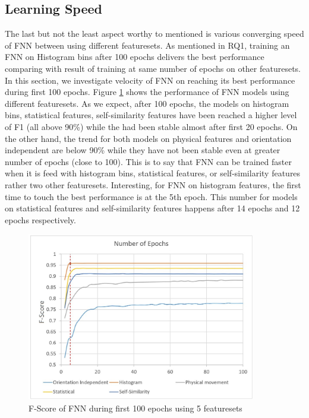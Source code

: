 \documentclass[journal,article,submit,moreauthors,pdftex]{Definitions/mdpi}
\begin{document}
\subsection{Learning Speed }
The last but not the least aspect worthy to mentioned is various converging speed of FNN between using different featuresets. As mentioned in RQ1, training an FNN on Histogram bins after 100 epochs delivers the best performance comparing with result of training at same number of epochs on other featuresets. In this section, we investigate velocity of FNN on reaching its best performance during first 100 epochs. Figure \ref{fig:fnn_learning_speed} shows the performance of FNN models using different featuresets. As we expect, after 100 epochs, the models on histogram bins, statistical features, self-similarity features have been reached a higher level of F1 (all above 90\%) while the had been stable almost after first 20 epochs. On the other hand, the trend for both models on physical features and orientation independent are below 90\% while they have not been stable even at greater number of epochs (close to 100). This is to say that FNN can be trained faster when it is feed with histogram bins, statistical features, or self-similarity features rather two other featuresets. Interesting, for FNN on histogram features, the first time to touch the best performance is at the 5th epoch. This number for models on statistical features and self-similarity features happens after 14 epochs and 12 epochs respectively.

\begin{figure}[H]
	\centering
		\includegraphics[width= 10cm]{Definitions/images/fnn_learning_speed.jpg}
		\caption{F-Score of FNN during first 100 epochs using 5 featuresets}
		\label{fig:fnn_learning_speed}
\end{figure} 
\end{document}
